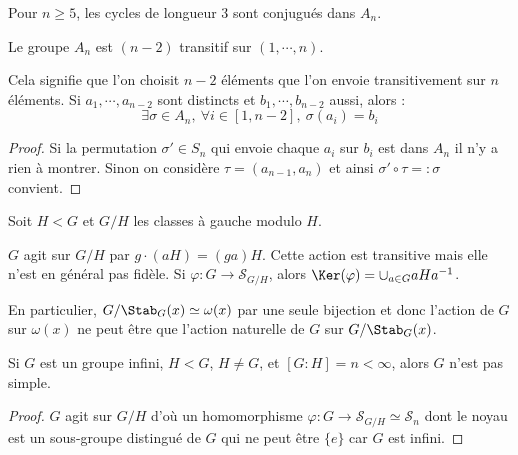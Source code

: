 \begin{prop}

 Pour $n \geq 5$, les cycles de longueur 3 sont conjugués dans $A_n$.
\end{prop}

\begin{lemm}

 Le groupe $A_n$ est $(n-2)$ transitif sur $(1,\cdots,n)$.

 Cela signifie que l'on choisit $n-2$ éléments que l'on envoie transitivement
sur $n$ éléments. Si $a_1, \cdots , a_{n-2}$ sont distincts et $b_1,
\cdots,b_{n-2}$ aussi, alors : 
\begin{displaymath} \exists \sigma \in A_n,\ \forall i \in [ 1, n-2],\ \sigma
(a_i) =
b_i \end{displaymath}
\end{lemm}

\begin{proof}
 Si la permutation $\sigma' \in S_n$ qui envoie chaque $a_i$ sur $b_i$ est dans
$A_n$ il n'y a rien à montrer. Sinon on considère $\tau = (a_{n-1},a_n)$ et
ainsi $\sigma' \circ \tau =: \sigma$ convient.
\end{proof}

\begin{example}[Exemple]
 Soit $H < G$ et $G/H$ les classes à gauche modulo $H$.

$G$ agit sur $G/H$ par $g\cdotp (aH) = (ga)H$. Cette action est transitive mais
elle n'est en général pas fidèle. Si $\varphi : G \longrightarrow
\mathcal{S}_{G/H}$, alors $\Ker (\varphi) = \cup_{a\in G} aHa^{-1}$.

En particulier, $G/\Stab_G(x) \simeq \omega(x)$ par une seule bijection et donc
l'action de $G$ sur $\omega(x)$ ne peut être que l'action naturelle de $G$ sur
$G/\Stab_G(x)$.
\end{example}

\begin{prop}[Application]

 Si $G$ est un groupe infini, $H < G$, $H\neq G$, et $[G:H] = n < \infty$,
alors $G$ n'est pas simple.
\end{prop}

\begin{proof}
 $G$ agit sur $G/H$ d'où un homomorphisme $\varphi : G \longrightarrow
\mathcal{S}_{G/H} \simeq \mathcal{S}_n$ dont le noyau est un sous-groupe
distingué de $G$ qui ne peut être $\{e\}$ car $G$ est infini.
\end{proof}

